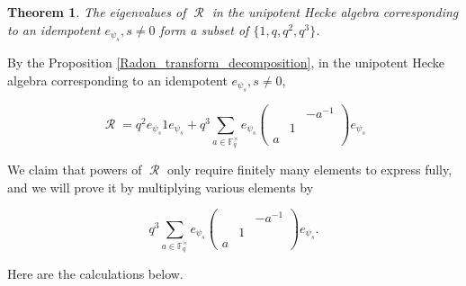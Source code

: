 \documentclass[12pt,reqno]{amsart}
\newtheorem{thm}{Theorem}[section]
\theoremstyle{definition}
\theoremstyle{remark}
\numberwithin{equation}{section}
\DeclareMathOperator{\R}{\mathcal{R}}
\def\IM#1{\textcolor[rgb]{0.00,0.00,0.75}{[I: #1]}}
\begin{document}
\begin{thm}\label{eigenvalues_GGH_gl3}
    The eigenvalues of $\R$ in the unipotent Hecke algebra corresponding to an idempotent $e_{\psi_s},s\neq 0$ form a subset of $\{1,q,q^2,q^3\}$. %
\end{thm}

    By the Proposition \ref{Radon_transform_decomposition}, in the unipotent Hecke algebra corresponding to an idempotent $e_{\psi_s},s\neq 0$,

    \begin{equation*}
        \R = q^2 e_{\psi_s} 1 e_{\psi_s} + q^3 \sum_{a \in \mathbb{F}_q^\times} e_{\psi_s} \begin{pmatrix}
            & & -a^{-1}\\
            & 1 &\\
            a & &
        \end{pmatrix} e_{\psi_s}
    \end{equation*}

    We claim that powers of $\R$ only require finitely many elements to express fully, and we will prove it by multiplying various elements by
    
    \[
        q^3 \sum_{a \in \mathbb{F}_q^\times} e_{\psi_s} \begin{pmatrix}
        & & -a^{-1}\\
        & 1 &\\
        a & &
    \end{pmatrix} e_{\psi_s}.
    \]
    
    Here are the calculations below. %

\end{document}
